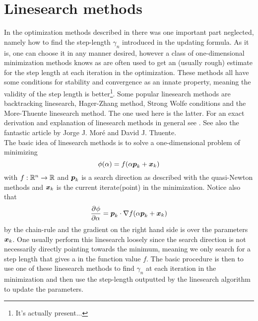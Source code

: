\section{Linesearch methods\label{sec:linesearch_methods}}
    In the optimization methods described in
     there was one important
    part neglected, namely how to find the step-length $\gamma_n$ introduced in
    the updating formula. As it is, one can choose it in any manner desired,
    however a class of one-dimensional minimization methods knows as
     are often used to get an (usually rough)
    estimate for the step length at each iteration in the optimization. These
    methods all have some conditions for stability and convergence as an innate
    property, meaning the validity of the step length is better\footnote{It's
    actually present...}. Some popular linesearch methods are backtracking
    linesearch, Hager-Zhang method, Strong Wolfe conditions and the
    More-Thuente linesearch method. The one used here is the latter.  For an
    exact derivation and explanation of linesearch methods in general see
    \cite{numOptNocWrig}. See also the fantastic article by Jorge J.  Mor{\'e}
    and David J. Thuente\cite{moreThuenteArticle}. \\
    The basic idea of linesearch methods is to solve a one-dimensional problem
    of minimizing
        \begin{equation}
            \phi(\alpha) = f(\alpha \boldsymbol{{p}}_k + \boldsymbol{{x}}_k)
        \end{equation}
    with $f:\mathbb{R}^n\rightarrow\mathbb{R}$ and $\boldsymbol{{p}}_k$ is a search direction
    as described with the quasi-Newton methods and $\boldsymbol{{x}}_k$ is the current
    iterate(point) in the minimization. Notice also that
        \begin{equation}
            \prd{\alpha}[\phi] = \blds{p}_k \cdot \nabla f(\alpha \blds{p}_k +
            \blds{x}_k)
        \end{equation}
    by the chain-rule and the gradient on the right hand side is over the
    parameters $\boldsymbol{{x}}_k$. One usually perform this linesearch loosely since
    the search direction is not necessarily directly pointing towards the
    minimum, meaning we only search for a step length that gives a
     in the function value $f$. The basic procedure
    is then to use one of these linesearch methods to find $\gamma_n$ at each
    iteration in the minimization and then use the step-length outputted by the
    linesearch algorithm to update the parameters.

